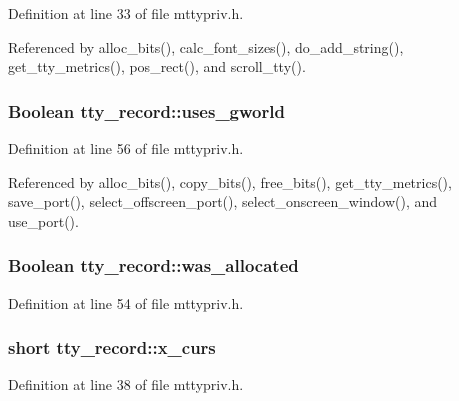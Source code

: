 Definition at line 33 of file mttypriv.\+h.



Referenced by alloc\+\_\+bits(), calc\+\_\+font\+\_\+sizes(), do\+\_\+add\+\_\+string(), get\+\_\+tty\+\_\+metrics(), pos\+\_\+rect(), and scroll\+\_\+tty().

\hypertarget{structtty__record_ae3a431435a1b84faf10f4b41471ca5fc}{
\subsubsection[{uses\+\_\+gworld}]{\setlength{\rightskip}{0pt plus 5cm}Boolean tty\+\_\+record\+::uses\+\_\+gworld}}\label{structtty__record_ae3a431435a1b84faf10f4b41471ca5fc}


Definition at line 56 of file mttypriv.\+h.



Referenced by alloc\+\_\+bits(), copy\+\_\+bits(), free\+\_\+bits(), get\+\_\+tty\+\_\+metrics(), save\+\_\+port(), select\+\_\+offscreen\+\_\+port(), select\+\_\+onscreen\+\_\+window(), and use\+\_\+port().

\hypertarget{structtty__record_a3d92b2b933fbf1829bff1560b6888e2f}{
\subsubsection[{was\+\_\+allocated}]{\setlength{\rightskip}{0pt plus 5cm}Boolean tty\+\_\+record\+::was\+\_\+allocated}}\label{structtty__record_a3d92b2b933fbf1829bff1560b6888e2f}


Definition at line 54 of file mttypriv.\+h.

\hypertarget{structtty__record_a71665a1dfb9be5900cc5849c78025794}{
\subsubsection[{x\+\_\+curs}]{\setlength{\rightskip}{0pt plus 5cm}short tty\+\_\+record\+::x\+\_\+curs}}\label{structtty__record_a71665a1dfb9be5900cc5849c78025794}


Definition at line 38 of file mttypriv.\+h.



